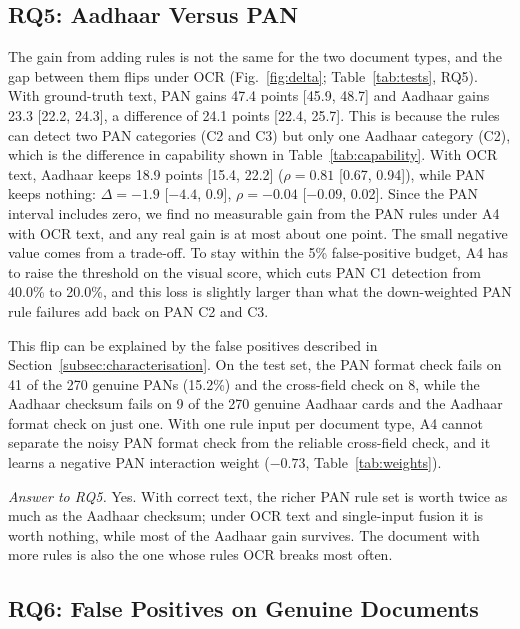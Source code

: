 \documentclass[12pt]{article}
\begin{document}
\subsection{RQ5: Aadhaar Versus PAN}
\label{subsec:res-rq5}


The gain from adding rules is not the same for the two document types, and the gap between them flips under OCR (Fig.~\ref{fig:delta}; Table~\ref{tab:tests}, RQ5). With ground-truth text, PAN gains 47.4 points [45.9, 48.7] and Aadhaar gains 23.3 [22.2, 24.3], a difference of 24.1 points [22.4, 25.7]. This is because the rules can detect two PAN categories (C2 and C3) but only one Aadhaar category (C2), which is the difference in capability shown in Table~\ref{tab:capability}. With OCR text, Aadhaar keeps 18.9 points [15.4, 22.2] ($\rho=0.81$ [0.67, 0.94]), while PAN keeps nothing: $\Delta=-1.9$ [$-4.4$, 0.9], $\rho=-0.04$ [$-0.09$, 0.02]. Since the PAN interval includes zero, we find no measurable gain from the PAN rules under A4 with OCR text, and any real gain is at most about one point. The small negative value comes from a trade-off. To stay within the 5\% false-positive budget, A4 has to raise the threshold on the visual score, which cuts PAN C1 detection from 40.0\% to 20.0\%, and this loss is slightly larger than what the down-weighted PAN rule failures add back on PAN C2 and C3.

This flip can be explained by the false positives described in Section~\ref{subsec:characterisation}. On the test set, the PAN format check fails on 41 of the 270 genuine PANs (15.2\%) and the cross-field check on 8, while the Aadhaar checksum fails on 9 of the 270 genuine Aadhaar cards and the Aadhaar format check on just one. With one rule input per document type, A4 cannot
separate the noisy PAN format check from the reliable cross-field
check, and it learns a negative PAN interaction weight ($-0.73$,
Table~\ref{tab:weights}).

\emph{Answer to RQ5.} Yes. With correct text, the richer PAN rule set
is worth twice as much as the Aadhaar checksum; under OCR text and
single-input fusion it is worth nothing, while most of the Aadhaar
gain survives. The document with more rules is also the one whose rules
OCR breaks most often.

\subsection{RQ6: False Positives on Genuine Documents}
\label{subsec:res-rq6}
\end{document}

